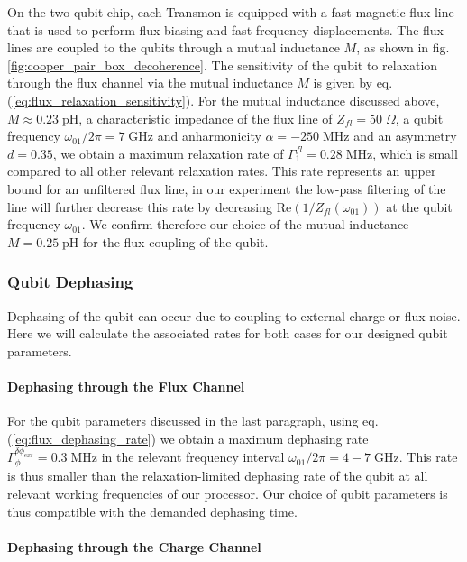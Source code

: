 On the two-qubit chip, each Transmon is equipped with a fast magnetic flux line that is used to perform flux biasing and fast frequency displacements. The flux lines are coupled to the qubits through a mutual inductance $M$, as shown in fig. \ref{fig:cooper_pair_box_decoherence}. The sensitivity of the qubit to relaxation through the flux channel via the mutual inductance $M$ is given by eq. (\ref{eq:flux_relaxation_sensitivity}). For the mutual inductance discussed above, $M \approx 0.23\;\mathrm{pH}$, a characteristic impedance of the flux line of $Z_{fl}=50\;\Omega$, a qubit frequency $\omega_{01}/2\pi= 7 \;\mathrm{GHz}$ and anharmonicity $\alpha=-250\;\mathrm{MHz}$ and an asymmetry $d=0.35$, we obtain a maximum relaxation rate of $\Gamma_1^{fl}=0.28\;\mathrm{MHz}$, which is small compared to all other relevant relaxation rates. This rate represents an upper bound for an unfiltered flux line, in our experiment the low-pass filtering of the line will further decrease this rate by decreasing $\mathrm{Re}(1/Z_{fl}(\omega_{01}))$ at the qubit frequency $\omega_{01}$. We confirm therefore our choice of the mutual inductance $M=0.25\;\mathrm{pH}$ for the flux coupling of the qubit. 

\subsubsection{Qubit Dephasing}

Dephasing of the qubit can occur due to coupling to external charge or flux noise. Here we will calculate the associated rates for both cases for our designed qubit parameters.

\paragraph{Dephasing through the Flux Channel}

For the qubit parameters discussed in the last paragraph, using eq. (\ref{eq:flux_dephasing_rate}) we obtain a maximum dephasing rate $\Gamma_\phi^{\delta \phi_{ext}}= 0.3\;\mathrm{MHz}$ in the relevant frequency interval $\omega_{01}/2\pi = 4-7 \; \mathrm{GHz}$. This rate is thus smaller than the relaxation-limited dephasing rate of the qubit at all relevant working frequencies of our processor. Our choice of qubit parameters is thus compatible with the demanded dephasing time.

\paragraph{Dephasing through the Charge Channel}

